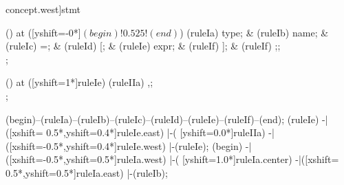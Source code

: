 \begin{syntax}[[xshift=24mm]concept.west]{stmt}
  
  \node[sequence,column sep=1.0cm] () at ([yshift=-0*\syntaxruledist]$(begin)!0.525!(end)$) {
    \node[nonterminal]    (ruleIa) {type};
    &
    \node[terminal]       (ruleIb) {name};
    &
    \node[terminal]       (ruleIc) {=};
    &
    \node[terminal]       (ruleId) {[};
    &
    \node[nonterminal]    (ruleIe) {expr};
    &
    \node[terminal]       (ruleIf) {]};
    &
    \node[terminal]       (ruleIf) {;};
    \\
  };
  
  \node[sequence] () at ([yshift=1*\syntaxruledist]ruleIe) {
    \node[terminal]    (ruleIIa) {,};
    \\
  };
  
  \draw[path] (begin)--(ruleIa)--(ruleIb)--(ruleIc)--(ruleId)--(ruleIe)--(ruleIf)--(end);
  \draw[path] (ruleIe)
            -|([xshift= 0.5*\syntaxruledist,yshift=0.4*\syntaxruledist]ruleIe.east)
            |-(                            [yshift=0.0*\syntaxruledist]ruleIIa)
            -|([xshift=-0.5*\syntaxruledist,yshift=0.4*\syntaxruledist]ruleIe.west)
            |-(ruleIe);
  \draw[path] (begin)
            -|([xshift=-0.5*\syntaxruledist,yshift=0.5*\syntaxruledist]ruleIa.west)
            |-(                            [yshift=1.0*\syntaxruledist]ruleIa.center)
            -|([xshift= 0.5*\syntaxruledist,yshift=0.5*\syntaxruledist]ruleIa.east)
            |-(ruleIb);
\end{syntax}

